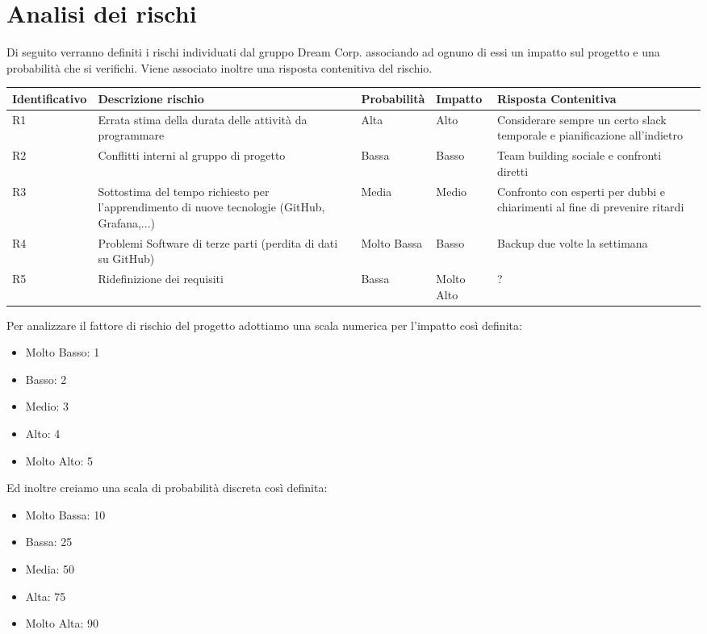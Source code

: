 \section{Analisi dei rischi}

		Di seguito verranno definiti i rischi individuati dal gruppo Dream Corp. associando ad ognuno di essi un impatto sul progetto e una probabilità che si verifichi. Viene associato inoltre una risposta contenitiva del rischio. 
		\newline \newline
		\begin{tabularx}{\textwidth}{|X|X|X|X|X|}
			\hline
			\textbf{Identificativo} & \textbf{Descrizione rischio} & \textbf{Probabilità} & \textbf{Impatto} & \textbf{Risposta Contenitiva}\\
			\hline
			R1 & Errata stima della durata delle attività da programmare & Alta & Alto & Considerare sempre un certo slack temporale e pianificazione all’indietro\\
			\hline
			R2 & Conflitti interni al gruppo di progetto & Bassa & Basso & Team building sociale e confronti diretti\\
			\hline
			R3 & Sottostima del tempo richiesto per l’apprendimento di nuove tecnologie (GitHub, Grafana,...) & Media & Medio & Confronto con esperti per dubbi e chiarimenti al fine di prevenire ritardi\\
			\hline
			R4 & Problemi Software di terze parti (perdita di dati su GitHub) & Molto  Bassa & Basso &  Backup due volte la settimana\\
			\hline
			R5 & Ridefinizione dei requisiti & Bassa & Molto Alto & ?\\
			\hline
		\end{tabularx}
		\newline \newline
		Per analizzare il fattore di rischio del progetto adottiamo una scala numerica per l’impatto così definita:
		\begin{itemize}
			\item Molto Basso: 1
			\item Basso: 2
			\item Medio: 3
			\item Alto: 4
			\item Molto Alto: 5
		\end{itemize}
		Ed inoltre creiamo una scala di probabilità discreta così definita:
		\begin{itemize}
			\item Molto Bassa: 10%
			\item Bassa: 25%
			\item Media: 50%
			\item Alta: 75%
			\item Molto Alta: 90%
		\end{itemize}
